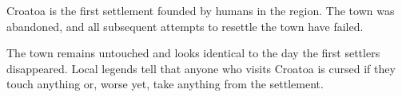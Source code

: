 Croatoa is the first settlement founded by humans in the region.
The town was abandoned, and all subsequent attempts to resettle the town have failed.

The town remains untouched and looks identical to the day the first settlers disappeared.
Local legends tell that anyone who visits Croatoa is cursed if they touch anything or, worse yet, take anything from the settlement.
